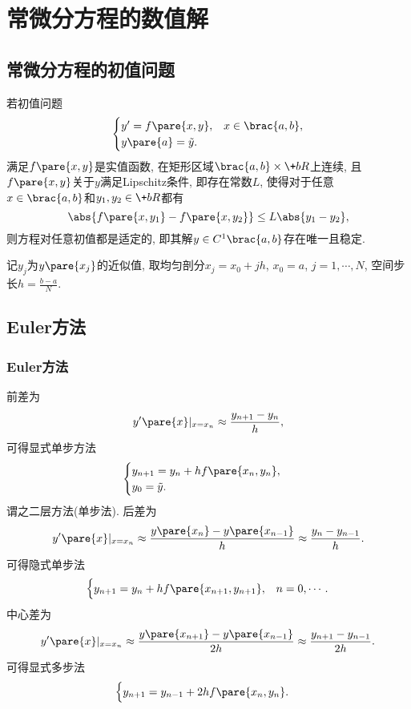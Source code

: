 \documentclass[hidelinks]{ctexart}
\begin{document}
\section{常微分方程的数值解} %
\label{sec:常微分方程的数值解}

\subsection{常微分方程的初值问题} %
\label{sub:常微分方程的初值问题}

\begin{theorem}
    若初值问题
    \[ \begin{cases}
        y' = f\pare{x,y}, & x\in\brac{a,b}, \\
        y\pare{a} = \tilde{y}.
    \end{cases} \]
    满足$f\pare{x,y}$是实值函数, 在矩形区域$\brac{a,b} \times \+bR$上连续, 且$f\pare{x,y}$关于$y$满足Lipschitz条件, 即存在常数$L$, 使得对于任意$x\in\brac{a,b}$和$y_1,y_2 \in \+bR$都有
    \[ \abs{f\pare{x,y_1} - f\pare{x,y_2}} \le L\abs{y_1-y_2}, \]
    则方程对任意初值都是适定的, 即其解$y\in C^1\brac{a,b}$存在唯一且稳定.
\end{theorem}
记$y_j$为$y\pare{x_j}$的近似值, 取均匀剖分$x_j = x_0 + jh$, $x_0 = a$, $j = 1,\cdots,N$, 空间步长$\displaystyle h = \frac{b-a}{N}$.


\subsection{Euler方法} %
\label{sub:euler方法}

\subsubsection{Euler方法} %
\label{ssub:euler方法}

\newpoint{}前差为
\[ y'\pare{x}\vert_{x=x_n} \approx \frac{y_{n+1} - y_n}{h}, \]
可得显式单步方法
\[ \begin{cases}
    y_{n+1} = y_n + hf\pare{x_n,y_n}, \\
    y_0 = \tilde{y}.
\end{cases} \]
谓之二层方法(单步法).
\newpoint{}后差为
\[ y'\pare{x}\vert_{x=x_n} \approx \frac{y\pare{x_n} - y\pare{x_{n-1}}}{h} \approx \frac{y_n - y_{n-1}}{h}. \]
可得隐式单步法
\[ \begin{cases}
    y_{n+1} = y_n + hf\pare{x_{n+1},y_{n+1}}, & n = 0,\cdots.
\end{cases} \]
\newpoint{}中心差为
\[ y'\pare{x}\vert_{x=x_n} \approx \frac{y\pare{x_{n+1}} - y\pare{x_{n-1}}}{2h} \approx \frac{y_{n+1} - y_{n-1}}{2h}. \]
可得显式多步法
\[ \begin{cases}
    y_{n+1} = y_{n-1} + 2hf\pare{x_n,y_n}.
\end{cases} \]
\end{document}
